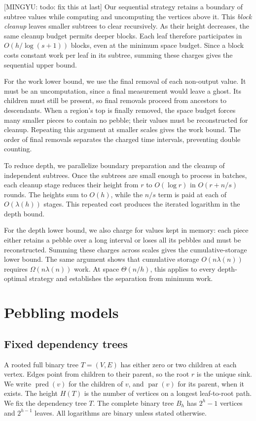 \documentclass[11pt]{article}
\theoremstyle{definition}
\theoremstyle{remark}
\DeclareMathOperator{\pred}{pred}
\DeclareMathOperator{\parv}{par}
\newcommand{\mingyu}[1]{{\color{magenta}\footnotesize [MINGYU: #1]}} %
\begin{document}
\mingyu{todo: fix this at last}
Our sequential strategy retains a boundary of subtree values while computing and uncomputing the vertices above it. This \emph{block cleanup} leaves smaller subtrees to clear recursively. As their height decreases, the same cleanup budget permits deeper blocks. Each leaf therefore participates in $O(h/\log(s+1))$ blocks, even at the minimum space budget. Since a block costs constant work per leaf in its subtree, summing these charges gives the sequential upper bound.

For the work lower bound, we use the final removal of each non-output value. It must be an uncomputation, since a final measurement would leave a ghost. Its children must still be present, so final removals proceed from ancestors to descendants. When a region's top is finally removed, the space budget forces many smaller pieces to contain no pebble; their values must be reconstructed for cleanup. Repeating this argument at smaller scales gives the work bound. The order of final removals separates the charged time intervals, preventing double counting.

To reduce depth, we parallelize boundary preparation and the cleanup of independent subtrees. Once the subtrees are small enough to process in batches, each cleanup stage reduces their height from $r$ to $O(\log r)$ in $O(r+n/s)$ rounds. The heights sum to $O(h)$, while the $n/s$ term is paid at each of $O(\lambda(h))$ stages. This repeated cost produces the iterated logarithm in the depth bound.

For the depth lower bound, we also charge for values kept in memory: each piece either retains a pebble over a long interval or loses all its pebbles and must be reconstructed. Summing these charges across scales gives the cumulative-storage lower bound. The same argument shows that cumulative storage $O(n\lambda(n))$ requires $\Omega(n\lambda(n))$ work. At space $\Theta(n/h)$, this applies to every depth-optimal strategy and establishes the separation from minimum work.

\section{Pebbling models}
\label{sec:models}

\subsection{Fixed dependency trees}

A rooted full binary tree $T=(V,E)$ has either zero or two children at each vertex. Edges point from children to their parent, so the root $r$ is the unique sink. We write $\pred(v)$ for the children of $v$, and $\parv(v)$ for its parent, when it exists. The height $H(T)$ is the number of vertices on a longest leaf-to-root path. We fix the dependency tree $T$. The complete binary tree $B_h$ has
$2^h-1$ vertices and $2^{h-1}$ leaves.
All logarithms are binary unless stated otherwise.
\end{document}
